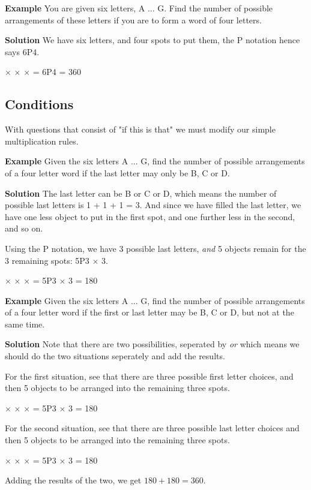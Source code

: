 \documentclass{article}
\begin{document}
\textbf{Example}  You are given six letters, A ... G. Find the number of possible arrangements
of these letters if you are to form a word of four letters.

\textbf{Solution}  We have six letters, and four spots to put them, the P notation hence says 6P4.
\begin{center}
	 $\times$  $\times$  $\times$  = 6P4 = 360
\end{center}

\subsection*{Conditions}
With questions that consist of "if this is that" we must modify our simple multiplication rules.

\textbf{Example}  Given the six letters A ... G, find the number of possible arrangements of a four
letter word if the last letter may only be B, C or D.

\textbf{Solution} The last letter can be B or C or D, which means the number of possible last
letters is 1 + 1 + 1 = 3. And since we have filled the last letter, we have one less object to put
in the first spot, and one further less in the second, and so on.

Using the P notation, we have 3 possible last letters, \textit{and} 5 objects remain for the 3 remaining
spots: 5P3 $\times$ 3.
\begin{center}
	 $\times$  $\times$  $\times$  = 5P3 $\times$ 3 = 180
\end{center}

\textbf{Example} Given the six letters A ... G, find the number of possible arrangements of a four
letter word if the first or last letter may be B, C or D, but not at the same time.


\textbf{Solution} Note that there are two possibilities, seperated by \textit{or} which means we
should do the two situations seperately and add the results.

For the first situation, see that there are three possible first letter choices, and then 5 objects
to be arranged into the remaining three spots.
\begin{center}
	 $\times$  $\times$  $\times$  = 5P3 $\times$ 3 = 180
\end{center}
For the second situation, see that there are three possible last letter choices and then 5 objects
to be arranged into the remaining three spots.
\begin{center}
	 $\times$  $\times$  $\times$  = 5P3 $\times$ 3 = 180
\end{center}
Adding the results of the two, we get $180 + 180 = 360$.
\end{document}
